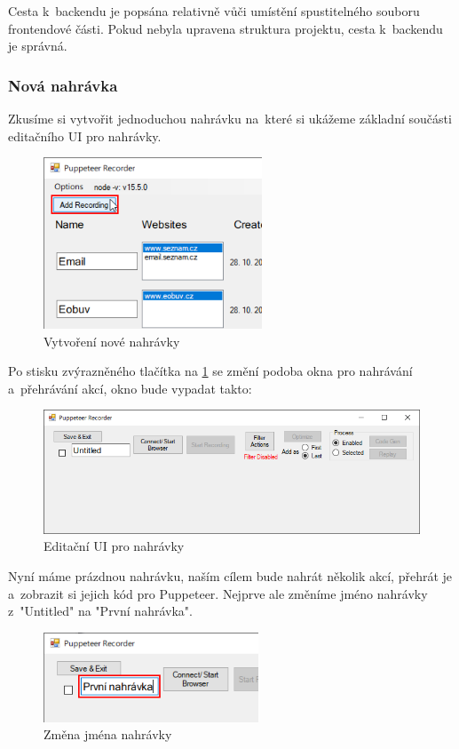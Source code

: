 \documentclass[12pt, a4paper, twoside]{article}
\begin{document}
	Cesta k~backendu je popsána relativně vůči umístění spustitelného souboru frontendové části. Pokud nebyla upravena struktura projektu, cesta k~backendu je správná.
	\subsubsection{Nová nahrávka}
	Zkusíme si vytvořit jednoduchou nahrávku na~které si ukážeme základní součásti editačního UI pro nahrávky. 
	\begin{figure}[H]
		\centering
		\includegraphics[width=0.58\textwidth]{addNewRecording.png}
		\caption{Vytvoření nové nahrávky}
		\label{fig:addNewRecording}
	\end{figure}
	\newpage
	Po stisku zvýrazněného tlačítka na \cref{fig:addNewRecording} se změní podoba okna pro nahrávání a~přehrávání akcí, okno bude vypadat takto:
	\begin{figure}[H]
		\centering
		\includegraphics[width=1.0\textwidth]{emptyRecordingEdit.png}
		\caption{Editační UI pro nahrávky}
	\end{figure}
	Nyní máme prázdnou nahrávku, naším cílem bude nahrát několik akcí, přehrát je a~zobrazit si jejich kód pro Puppeteer. Nejprve ale změníme jméno nahrávky z~"Untitled" na "První nahrávka".
	\begin{figure}[H]
		\centering
		\includegraphics[width=0.57\textwidth]{recordingNameChange.png}
		\caption{Změna jména nahrávky}
	\end{figure}
\end{document}
